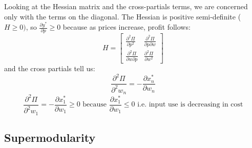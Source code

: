 \documentclass{article}
\begin{document}
\noindent Looking at the Hessian matrix and the cross-partials terms, we are concerned only with the terms on the diagonal. The Hessian is positive semi-definite ($H \geq 0)$, so $\frac{\partial y^*}{\partial p} \geq 0$ because as prices increase, profit follows: 
\[
H =
\begin{bmatrix}
\frac{\partial^2 \Pi}{\partial p^2} & \frac{\partial^2 \Pi}{\partial p \partial w} \\[8pt]
\frac{\partial^2 \Pi}{\partial w \partial p} & \frac{\partial^2 \Pi}{\partial w^2}
\end{bmatrix}
\]
and the cross partials tell us:
\[
\frac{\partial^2\Pi}{\partial^2w_n} = -\frac{\partial x^*_{n}}{\partial w_n}
\]
\[
\frac{\partial^2\Pi}{\partial^2w_1} = -\frac{\partial x^*_{1}}{\partial w_1} \geq 0 \text{ because  } \frac{\partial x^*_{1}}{\partial w_1} \leq 0 \text{ i.e. input use is decreasing in cost}
\]

\subsection{Supermodularity}\label{super}
\end{document}

